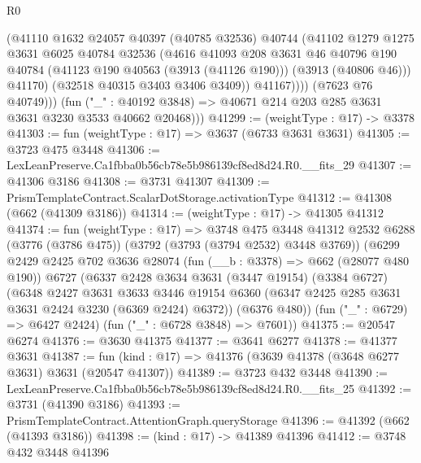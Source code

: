 \begin{lexlean}{R0}
\begin{coremodule}
                    (@41110
                      @1632
                      @24057
                      @40397
                      (@40785 @32536)
                      @40744
                      (@41102
                        @1279
                        @1275
                        @3631
                        @6025
                        @40784
                        @32536
                        (@4616
                          @41093
                          @208
                          @3631
                          @46
                          @40796
                          @190
                          @40784
                          (@41123 @190 @40563 (@3913 (@41126 @190)))
                          (@3913 (@40806 @46)))
                        @41170)
                      (@32518 @40315 @3403 @3406 @3409))
                    @41167))))
            (@7623 @76 @40749)))
        (fun ("_" : @40192 @3848) => @40671 @214 @203 @285 @3631 @3631 @3230 @3533 @40662 @20468)))
@41299 := (weightType : @17) -> @3378
@41303 := fun (weightType : @17) => @3637 (@6733 @3631 @3631)
@41305 := @3723 @475 @3448
@41306 := LexLeanPreserve.Ca1fbba0b56cb78e5b986139cf8ed8d24.R0.__fits_29
@41307 := @41306 @3186
@41308 := @3731 @41307
@41309 := PrismTemplateContract.ScalarDotStorage.activationType
@41312 := @41308 (@662 (@41309 @3186))
@41314 := (weightType : @17) -> @41305 @41312
@41374 := fun (weightType : @17) =>
  @3748
    @475
    @3448
    @41312
    @2532
    @6288
    (@3776 (@3786 @475))
    (@3792 (@3793 (@3794 @2532) @3448 @3769))
    (@6299
      @2429
      @2425
      @702
      @3636
      @28074
      (fun (__b : @3378) => @662 (@28077 @480 @190))
      @6727
      (@6337
        @2428
        @3634
        @3631
        (@3447 @19154)
        (@3384 @6727)
        (@6348
          @2427
          @3631
          @3633
          @3446
          @19154
          @6360
          (@6347 @2425 @285 @3631 @3631 @2424 @3230 (@6369 @2424) @6372))
        (@6376 @480))
      (fun ("_" : @6729) => @6427 @2424)
      (fun ("_" : @6728 @3848) => @7601))
@41375 := @20547 @6274
@41376 := @3630 @41375
@41377 := @3641 @6277
@41378 := @41377 @3631
@41387 := fun (kind : @17) => @41376 (@3639 @41378 (@3648 @6277 @3631) @3631 (@20547 @41307))
@41389 := @3723 @432 @3448
@41390 := LexLeanPreserve.Ca1fbba0b56cb78e5b986139cf8ed8d24.R0.__fits_25
@41392 := @3731 (@41390 @3186)
@41393 := PrismTemplateContract.AttentionGraph.queryStorage
@41396 := @41392 (@662 (@41393 @3186))
@41398 := (kind : @17) -> @41389 @41396
@41412 := @3748
    @432
    @3448
    @41396

\end{coremodule}
\end{lexlean}
